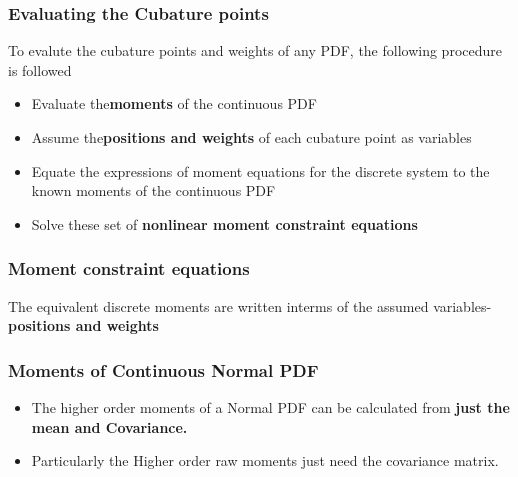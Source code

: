 \documentclass[11pt]{beamer}
\begin{document}
\begin{frame}
\frametitle{Evaluating the Cubature points}
To evalute the cubature points and weights of any PDF, the following procedure is followed 
\begin{itemize}[<+->]
\item Evaluate the{\bf  moments} of the continuous PDF
\item Assume the{\bf positions and weights} of each cubature point as variables
\item Equate the expressions of moment equations for the discrete system to the known moments of the continuous PDF
\item Solve these set of {\bf nonlinear moment constraint equations} 
\end{itemize}
\end{frame}
\begin{frame}
\frametitle{Moment constraint equations  }
 The equivalent discrete moments are written interms of the assumed variables- {\bf positions and weights}

\end{frame}
\begin{frame}
\frametitle{Moments of Continuous Normal PDF}
\begin{itemize}[<+->]
\item The higher order moments of a Normal PDF can be calculated from {\bf just the mean and Covariance.}
\item Particularly the Higher order raw moments just need the covariance matrix. 
\end{itemize}
\end{frame}
\end{document}

